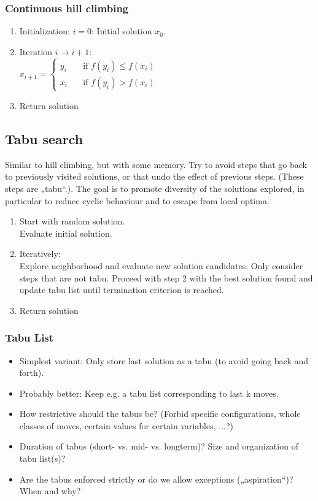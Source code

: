 \clearpage
\subsubsection{Continuous hill climbing}

\begin{enumerate}
    \item Initialization: $i = 0$:
    Initial solution $x_0$.
    \item Iteration $i \rightarrow i + 1$: \\
        $x_{i+1} =
        \begin{cases}
        y_i       & \quad \text{if } f(y_i) \leq f(x_i)\\
        x_i       & \quad \text{if } f(y_i) > f(x_i)
        \end{cases}$
        \item Return solution
\end{enumerate}

\subsection{Tabu search}
Similar to hill climbing, but with some memory. Try to avoid steps that go back to previously visited solutions, or
that undo the effect of previous steps. (These steps are „tabu“.). The goal is to promote diversity of the solutions explored, in
particular to reduce cyclic behaviour and to escape from local
optima.

\begin{enumerate}
    \item Start with random solution. \\
        Evaluate initial solution.
    \item Iteratively: \\
    Explore neighborhood and evaluate new solution
candidates. Only consider steps that are not tabu.
Proceed with step 2 with the best solution found and
update tabu list until termination criterion is reached.
    \item Return solution
\end{enumerate}

\subsubsection{Tabu List}
\begin{itemize}
    \item Simplest variant: Only store last solution as a tabu (to
avoid going back and forth).
\item Probably better: Keep e.g. a tabu list corresponding to last
k moves.
\item How restrictive should the tabus be? (Forbid specific
configurations, whole classes of moves, certain values for
certain variables, ...?)
\item Duration of tabus (short- vs. mid- vs. longterm)?
Size and organization of tabu list(s)?
\item Are the tabus enforced strictly or do we allow exceptions
(„aspiration“)? When and why?
\end{itemize}

